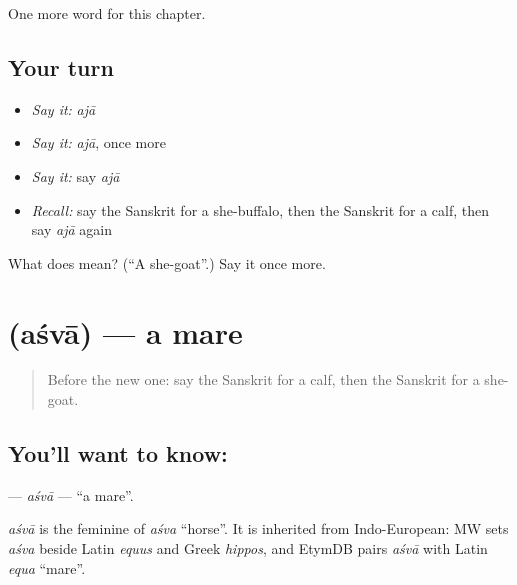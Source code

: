 \begin{grammarlens}[title={What you've built}]
One more word for this chapter.
\end{grammarlens}

\subsection*{Your turn}
\begin{itemize}
\raggedright
  \item \emph{Say it:} \emph{ajā}
  \item \emph{Say it:} \emph{ajā}, once more
  \item \emph{Say it:} say \emph{ajā}
  \item \emph{Recall:} say the Sanskrit for a she-buffalo, then the Sanskrit for a calf, then say \emph{ajā} again
\end{itemize}

\begin{tcolorbox}[breakable,colback=teal!4,colframe=teal!35!black,title={Before you move on}]
What does  mean? (\textquotedblleft{}A she-goat\textquotedblright{}.) Say it once more.
\end{tcolorbox}
\section[\texorpdfstring{\sk{अश्वा} (aśvā)}{अश्वा (aśvā)}]{ (aśvā) — a mare}

\label{lesson:SA-C167-asva}



\begin{quote}
Before the new one: say the Sanskrit for a calf, then the Sanskrit for a she-goat.
\end{quote}

\subsection*{You'll want to know: }
\textbf{} — \emph{aśvā} — \textquotedblleft{}a mare\textquotedblright{}.

\begin{cousinweb}
\emph{aśvā} is the feminine of \emph{aśva} \textquotedblleft{}horse\textquotedblright{}. It is inherited from Indo-European: MW sets \emph{aśva} beside Latin \emph{equus} and Greek \emph{hippos}, and EtymDB pairs \emph{aśvā} with Latin \emph{equa} \textquotedblleft{}mare\textquotedblright{}.
\end{cousinweb}

